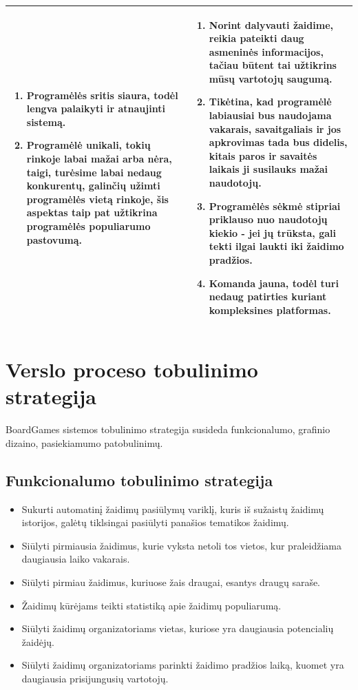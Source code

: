 \documentclass{VUMIFPSkursinis}
\begin{document}
\begin{longtable}{ | m{8cm} | m{8cm} | }
\begin{enumerate}
					\item Programėlės sritis siaura, todėl lengva palaikyti ir atnaujinti sistemą.
					\item Programėlė unikali, tokių rinkoje labai mažai arba nėra, taigi, turėsime labai nedaug konkurentų, galinčių užimti programėlės vietą rinkoje, šis aspektas taip pat užtikrina programėlės populiarumo pastovumą.
				\end{enumerate}
					& 
				\begin{enumerate}
					\item Norint dalyvauti žaidime, reikia pateikti daug asmeninės informacijos, tačiau būtent tai užtikrins mūsų vartotojų saugumą.
					\item Tikėtina, kad programėlė labiausiai bus naudojama vakarais, savaitgaliais ir jos apkrovimas tada bus didelis, kitais paros ir savaitės laikais ji susilauks mažai naudotojų.
					\item Programėlės sėkmė stipriai priklauso nuo naudotojų kiekio - jei jų trūksta, gali tekti ilgai laukti iki žaidimo pradžios. 
					\item Komanda jauna, todėl turi nedaug patirties kuriant kompleksines platformas.
				\end{enumerate}\tabularnewline \hline
			\end{longtable}
			
\section{Verslo proceso tobulinimo strategija}
BoardGames sistemos tobulinimo strategija susideda funkcionalumo, 
grafinio dizaino, pasiekiamumo patobulinimų.
	\subsection {Funkcionalumo tobulinimo strategija}
		\renewcommand{\labelitemi}{$\bullet$}
			\begin{itemize}
				\item Sukurti automatinį žaidimų pasiūlymų variklį, kuris iš sužaistų žaidimų istorijos, galėtų tiklsingai pasiūlyti panašios tematikos žaidimų.
				\item Siūlyti pirmiausia žaidimus, kurie vyksta netoli tos vietos, kur praleidžiama daugiausia laiko vakarais.
				\item Siūlyti pirmiau žaidimus, kuriuose žais draugai, esantys draugų saraše. 
				\item Žaidimų kūrėjams teikti statistiką apie žaidimų populiarumą.
				\item Siūlyti žaidimų organizatoriams vietas, kuriose yra daugiausia potencialių žaidėjų.
				\item Siūlyti žaidimų organizatoriams parinkti žaidimo pradžios laiką, kuomet yra daugiausia prisijungusių vartotojų.
			\end{itemize}
\end{document}
